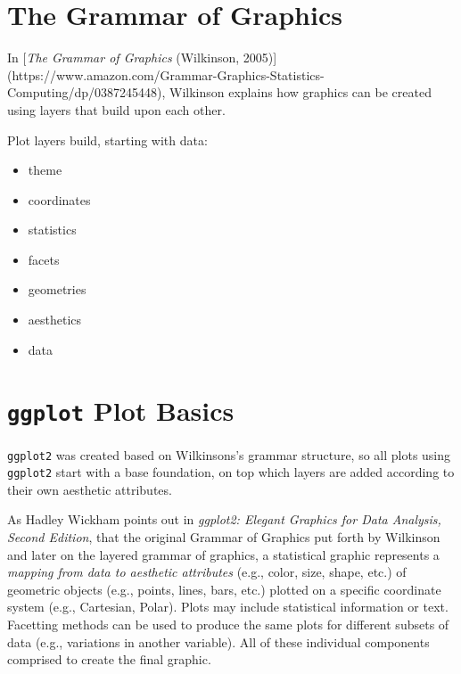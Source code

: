 \documentclass[
  letterpaper,
  DIV=11,
  numbers=noendperiod]{scrartcl}
\providecommand{\tightlist}{%
  \setlength{\itemsep}{0pt}\setlength{\parskip}{0pt}}\usepackage{longtable,booktabs,array}
\begin{document}
\hypertarget{the-grammar-of-graphics}{%
\section{\texorpdfstring{\textbf{The Grammar of
Graphics}}{The Grammar of Graphics}}\label{the-grammar-of-graphics}}

In {[}\emph{The Grammar of Graphics} (Wilkinson, 2005){]}
(https://www.amazon.com/Grammar-Graphics-Statistics-Computing/dp/0387245448),
Wilkinson explains how graphics can be created using layers that build
upon each other.

Plot layers build, starting with data:

\begin{itemize}
\tightlist
\item
  theme
\item
  coordinates
\item
  statistics
\item
  facets
\item
  geometries
\item
  aesthetics
\item
  data
\end{itemize}

\hypertarget{ggplot-plot-basics}{%
\section{\texorpdfstring{\textbf{\texttt{ggplot} Plot
Basics}}{ggplot Plot Basics}}\label{ggplot-plot-basics}}

\texttt{ggplot2} was created based on Wilkinsons's grammar structure, so
all plots using \texttt{ggplot2} start with a base foundation, on top
which layers are added according to their own aesthetic attributes.

As Hadley Wickham points out in \emph{ggplot2: Elegant Graphics for Data
Analysis, Second Edition}, that the original Grammar of Graphics put
forth by Wilkinson and later on the layered grammar of graphics, a
statistical graphic represents a \emph{mapping from data to aesthetic
attributes} (e.g., color, size, shape, etc.) of geometric objects (e.g.,
points, lines, bars, etc.) plotted on a specific coordinate system
(e.g., Cartesian, Polar). Plots may include statistical information or
text. Facetting methods can be used to produce the same plots for
different subsets of data (e.g., variations in another variable). All of
these individual components comprised to create the final graphic.
\end{document}
